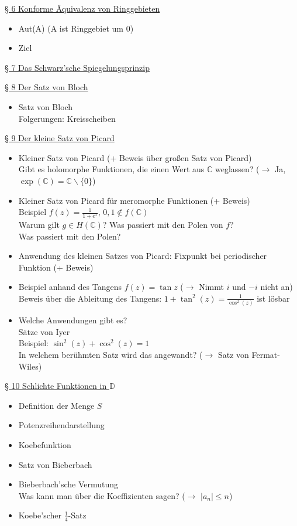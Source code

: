 \documentclass[11pt]{article}
\newcommand{\C}{\mathbb{C}}
\newcommand{\D}{\mathbb{D}}
\begin{document}
\underline{§ 6 Konforme Äquivalenz von Ringgebieten}
\begin{itemize}
\item Aut(A) (A ist Ringgebiet um $0$)
\item Ziel
\end{itemize}

\underline{§ 7 Das Schwarz'sche Spiegelungsprinzip}


\underline{§ 8 Der Satz von Bloch}
\vspace{-0.5cm}
\begin{itemize}
\item Satz von Bloch \\
\quad Folgerungen: Kreisscheiben
\end{itemize}

\underline{§ 9 Der kleine Satz von Picard}
\vspace{-0.5cm}
\begin{itemize}
\item Kleiner Satz von Picard (+ Beweis über großen Satz von Picard) \\
\quad Gibt es holomorphe Funktionen, die einen Wert aus $\C$ weglassen? ($\rightarrow$ Ja, $\exp(\C) = \C \backslash \{0\}$)
\item Kleiner Satz von Picard für meromorphe Funktionen (+ Beweis) \\
\quad Beispiel $f(z) = \frac{1}{1 + e^z}$, $0,1 \notin f(\C)$ \\
\quad Warum gilt $g \in H(\C)$? Was passiert mit den Polen von $f$? \\
\quad Was passiert mit den Polen?
\item Anwendung des kleinen Satzes von Picard: Fixpunkt bei periodischer Funktion (+ Beweis)
\item Beispiel anhand des Tangens $f(z) = \tan z$ ($\rightarrow$ Nimmt $i$ und $-i$ nicht an) \\
\quad Beweis über die Ableitung des Tangens: $1+\tan^2(z) = \frac{1}{\cos^2(z)}$ ist lösbar
\item Welche Anwendungen gibt es? \\
\quad Sätze von Iyer \\
\quad Beispiel: $\sin^2(z) + \cos^2(z) = 1$ \\
\quad In welchem berühmten Satz wird das angewandt? ($\rightarrow$ Satz von Fermat-Wiles)
\end{itemize}

\underline{§ 10 Schlichte Funktionen in $\D$}
\vspace{-0.5cm}
\begin{itemize}
\item Definition der Menge $S$
\item Potenzreihendarstellung
\item Koebefunktion 
\item Satz von Bieberbach
\item Bieberbach'sche Vermutung \\
\quad Was kann man über die Koeffizienten sagen? ($\rightarrow$ $|a_n| \leq n$)
\item Koebe'scher $\frac{1}{4}$-Satz 
\end{itemize}
\end{document}
